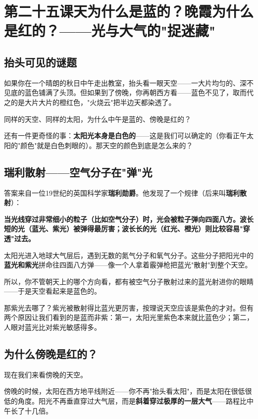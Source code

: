 \documentclass[a4paper,12pt]{ctexart}
\begin{document}
\newpage

\section{\textcolor{orange!80!black}{第二十五课\quad 天为什么是蓝的？晚霞为什么是红的？——光与大气的"捉迷藏"}}

\subsection*{抬头可见的谜题}

如果你在一个晴朗的秋日中午走出教室，抬头看一眼天空——一大片均匀的、深不见底的蓝色铺满了头顶。但如果到了傍晚，你再朝西方看——蓝色不见了，取而代之的是大片大片的橙红色，"火烧云"把半边天都染透了。

同样的天空、同样的太阳，为什么中午是蓝的、傍晚是红的？

还有一件更奇怪的事：\textbf{太阳光本身是白色的}——这是我们可以确定的（你看正午太阳的"颜色"就是白色刺眼的）。那天空的颜色到底是怎么来的？

\subsection*{瑞利散射——空气分子在"弹"光}

答案来自一位19世纪的英国科学家\textbf{瑞利勋爵}。他发现了一个规律（后来叫\textbf{瑞利散射}）：

\textbf{当光线穿过非常细小的粒子（比如空气分子）时，光会被粒子弹向四面八方。波长短的光（蓝光、紫光）被弹得最厉害；波长长的光（红光、橙光）则比较容易"穿透"过去。}

太阳光进入地球大气层后，遇到无数的氮气分子和氧气分子。这些分子把阳光中的\textbf{蓝光和紫光}拼命往四面八方弹——像一个人拿着霰弹枪把蓝光"散射"到整个天空。

所以，你不管朝天上的哪个方向看，都有被空气分子散射过来的蓝光射进你的眼睛——于是天空看起来是蓝色的。

那紫光去哪了？紫光被散射得比蓝光更厉害，按理说天空应该是紫色的才对。但有两个原因让我们看到的是蓝而非紫：第一，太阳光里紫色本来就比蓝色少；第二，人眼对蓝光比对紫光敏感得多。

\subsection*{为什么傍晚是红的？}

现在我们来看傍晚的天空。

傍晚的时候，太阳在西方地平线附近——你不再"抬头看太阳"，而是太阳在很低很低的角度。阳光不再垂直穿过大气层，而是\textbf{斜着穿过极厚的一层大气}——路程比中午长了十几倍。
\end{document}
